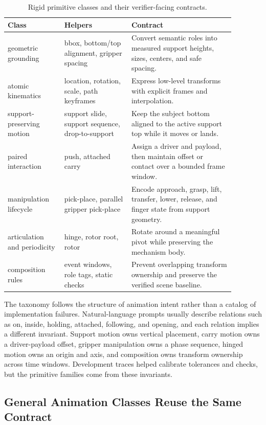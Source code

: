 \documentclass{article}
\begin{document}
\begin{table}[t]
\centering
\caption{Rigid primitive classes and their verifier-facing contracts.}
\label{tab:primitive-taxonomy}
\begin{tabular}{p{0.22\linewidth}p{0.26\linewidth}p{0.40\linewidth}}
\toprule
Class & Helpers & Contract \\
\midrule
geometric grounding & bbox, bottom/top alignment, gripper spacing & Convert semantic roles into measured support heights, sizes, centers, and safe spacing. \\
atomic kinematics & location, rotation, scale, path keyframes & Express low-level transforms with explicit frames and interpolation. \\
support-preserving motion & support slide, support sequence, drop-to-support & Keep the subject bottom aligned to the active support top while it moves or lands. \\
paired interaction & push, attached carry & Assign a driver and payload, then maintain offset or contact over a bounded frame window. \\
manipulation lifecycle & pick-place, parallel gripper pick-place & Encode approach, grasp, lift, transfer, lower, release, and finger state from support geometry. \\
articulation and periodicity & hinge, rotor root, rotor & Rotate around a meaningful pivot while preserving the mechanism body. \\
composition rules & event windows, role tags, static checks & Prevent overlapping transform ownership and preserve the verified scene baseline. \\
\bottomrule
\end{tabular}
\end{table}

The taxonomy follows the structure of animation intent rather than a catalog of implementation failures. Natural-language prompts usually describe relations such as on, inside, holding, attached, following, and opening, and each relation implies a different invariant. Support motion owns vertical placement, carry motion owns a driver-payload offset, gripper manipulation owns a phase sequence, hinged motion owns an origin and axis, and composition owns transform ownership across time windows. Development traces helped calibrate tolerances and checks, but the primitive families come from these invariants.

\subsection{General Animation Classes Reuse the Same Contract}
\end{document}
